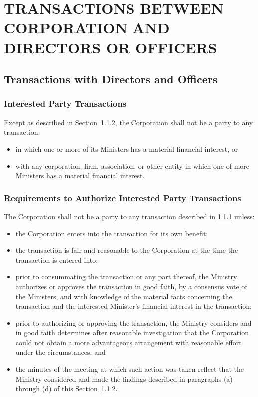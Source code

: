 \documentclass[letterpaper,titlepage]{article}
\begin{document}
\section{TRANSACTIONS BETWEEN CORPORATION AND DIRECTORS OR OFFICERS}
\label{sec:transactionsBetween}
\subsection{Transactions with Directors and Officers}
\label{sec:transactionsWith}
\subsubsection{Interested Party Transactions}
\label{sec:interestedParty}
Except as described in Section~\ref{sec:requirementsAuthorize}, the Corporation shall not be a party to any transaction:
\begin{itemize}
    \item[(1)] in which one or more of its Ministers has a material financial
        interest, or
    \item[(2)] with any corporation, firm, association, or other entity in which one
        of more Ministers has a material financial interest.
\end{itemize}
\subsubsection{Requirements to Authorize Interested Party Transactions}
\label{sec:requirementsAuthorize}
The Corporation shall not be a party to any transaction described in
\ref{sec:interestedParty} unless:
\begin{itemize}
    \item[(1)] the Corporation enters into the transaction for its own benefit;
    \item[(2)] the transaction is fair and reasonable to the Corporation at the time
        the transaction is entered into;
    \item[(3)] prior to consummating the transaction or any part thereof, the
        Ministry authorizes or approves the transaction in good faith, by a
        consensus vote of the Ministers, and with knowledge of the material
        facts concerning the transaction and the interested Minister's
        financial interest in the transaction;
    \item[(4)] prior to authorizing or approving the transaction, the Ministry
        considers and in good faith determines after reasonable investigation
        that the Corporation could not obtain a more advantageous arrangement
        with reasonable effort under the circumstances; and
    \item[(5)] the minutes of the meeting at which such action was taken reflect
        that the Ministry considered and made the findings described in
        paragraphs (a) through (d) of this
        Section~\ref{sec:requirementsAuthorize}.
\end{itemize}
\end{document}
